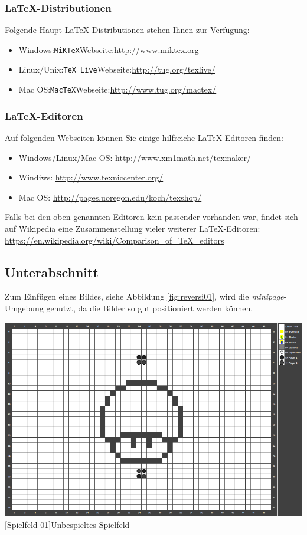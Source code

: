 \documentclass[12pt,a4paper,bibliography=totocnumbered,listof=totocnumbered]{article}
\begin{document}
\subsubsection{\LaTeX-Distributionen}
Folgende Haupt-\LaTeX-Distributionen stehen Ihnen zur Verfügung:
\begin{itemize}
  \item Windows:\quad \texttt{MiKTeX}\quad Webseite:\quad\url{http://www.miktex.org}
  \item Linux/Unix:\quad \texttt{TeX Live}\quad Webseite:\quad\url{http://tug.org/texlive/}
  \item Mac OS:\quad \texttt{MacTeX}\quad Webseite:\quad\url{http://www.tug.org/mactex/}
\end{itemize}

\subsubsection{\LaTeX-Editoren}
Auf folgenden Webseiten können Sie einige hilfreiche \LaTeX-Editoren finden:
\begin{itemize}
  \item Windows/Linux/Mac OS: \url{http://www.xm1math.net/texmaker/}
  \item Windiws: \url{http://www.texniccenter.org/}
  \item Mac OS: \url{http://pages.uoregon.edu/koch/texshop/}
\end{itemize}

Falls bei den oben genannten Editoren kein passender vorhanden war, findet sich auf Wikipedia eine Zusammenstellung vieler weiterer \LaTeX-Editoren:\\[1em]
\hspace*{3cm}\url{https://en.wikipedia.org/wiki/Comparison_of_TeX_editors}


\subsection{Unterabschnitt}\label{Kap:Minipage}
Zum Einfügen eines Bildes, siehe Abbildung \ref{fig:reversi01}, wird die \textit{minipage}-Umgebung genutzt, da die Bilder so gut positioniert werden können.

\vspace{1em}
\begin{minipage}{\linewidth}
	\centering
	\includegraphics[width=0.6\linewidth]{pics/gamefield01.png}
	[Spielfeld 01]{Unbespieltes Spielfeld\footnotemark }
	\label{fig:reversi01}
\end{minipage}
\end{document}
